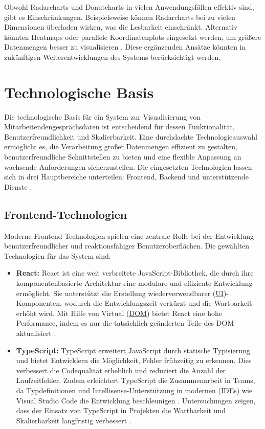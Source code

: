 Obwohl Radarcharts und Donutcharts in vielen Anwendungsfällen effektiv sind, gibt es Einschränkungen. Beispielsweise können Radarcharts bei zu vielen Dimensionen überladen wirken, was die Lesbarkeit einschränkt. Alternativ könnten Heatmaps oder parallele Koordinatenplots eingesetzt werden, um größere Datenmengen besser zu visualisieren \cite{ware2012information}. Diese ergänzenden Ansätze könnten in zukünftigen Weiterentwicklungen des Systems berücksichtigt werden.

\section{Technologische Basis}
Die technologische Basis für ein System zur Visualisierung von Mitarbeitendengesprächsdaten ist entscheidend für dessen Funktionalität, Benutzerfreundlichkeit und Skalierbarkeit. Eine durchdachte Technologieauswahl ermöglicht es, die Verarbeitung großer Datenmengen effizient zu gestalten, benutzerfreundliche Schnittstellen zu bieten und eine flexible Anpassung an wachsende Anforderungen sicherzustellen. Die eingesetzten Technologien lassen sich in drei Hauptbereiche unterteilen: Frontend, Backend und unterstützende Dienste \cite{fowler2002patterns}.



\subsection*{Frontend-Technologien}
Moderne Frontend-Technologien spielen eine zentrale Rolle bei der Entwicklung benutzerfreundlicher und reaktionsfähiger Benutzeroberflächen. Die gewählten Technologien für das System sind:
\begin{itemize}
    \item \textbf{React:}  
    React ist eine weit verbreitete JavaScript-Bibliothek, die durch ihre komponentenbasierte Architektur eine modulare und effiziente Entwicklung ermöglicht. Sie unterstützt die Erstellung wiederverwendbarer (\hyperref[abkuerzungen]{UI})-Komponenten, wodurch die Entwicklungszeit verkürzt und die Wartbarkeit erhöht wird. Mit Hilfe von Virtual (\hyperref[abkuerzungen]{DOM}) bietet React eine hohe Performance, indem es nur die tatsächlich geänderten Teile des DOM aktualisiert \cite{stefanov2021react}.


  \item \textbf{TypeScript:}  
TypeScript erweitert JavaScript durch statische Typisierung und bietet Entwicklern die Möglichkeit, Fehler frühzeitig zu erkennen. Dies verbessert die Codequalität erheblich und reduziert die Anzahl der Laufzeitfehler. Zudem erleichtert TypeScript die Zusammenarbeit in Teams, da Typdefinitionen und Intellisense-Unterstützung in modernen (\hyperref[abkuerzungen]{IDEs}) wie Visual Studio Code die Entwicklung beschleunigen \cite{typescriptDocumentation}. Untersuchungen zeigen, dass der Einsatz von TypeScript in Projekten die Wartbarkeit und Skalierbarkeit langfristig verbessert \cite{typescriptSurvey2021}.

\end{itemize}
\newpage

